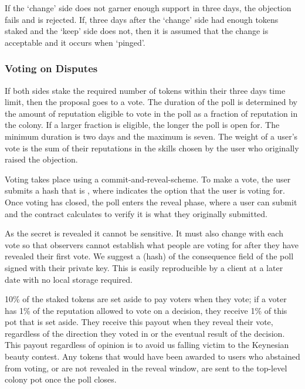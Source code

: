 If the `change' side does not garner enough support in three days, the objection fails and is rejected. If, three days after the `change' side had enough tokens staked and the `keep' side does not, then it is assumed that the change is acceptable and it occurs when `pinged'. 

\subsubsection{Voting on Disputes}
If both sides stake the required number of tokens within their three days time limit, then the proposal goes to a vote. The duration of the poll is determined by the amount of reputation eligible to vote in the poll as a fraction of reputation in the colony. If a larger fraction is eligible, the longer the poll is open for. The minimum duration is two days and the maximum is seven. The weight of a user's vote is the sum of their reputations in the skills chosen by the user who originally raised the objection.

Voting takes place using a commit-and-reveal-scheme. To make a vote, the user submits a hash that is , where  indicates the option that the user is voting for. Once voting has closed, the poll enters the reveal phase, where a user can submit  and the contract calculates  to verify it is what they originally submitted.

As the secret is revealed it cannot be sensitive. It must also change with each vote so that observers cannot establish what people are voting for after they have revealed their first vote. We suggest a (hash) of the consequence field of the poll signed with their private key. This is easily reproducible by a client at a later date with no local storage required.

10\% of the staked tokens are set aside to pay voters when they vote; if a voter has 1\% of the reputation allowed to vote on a decision, they receive 1\% of this pot that is set aside. They receive this payout when they reveal their vote, regardless of the direction they voted in or the eventual result of the decision. This payout regardless of opinion is to avoid us falling victim to the Keynesian beauty contest\cite{KeynesianBeauty}. Any tokens that would have been awarded to users who abstained from voting, or are not revealed in the reveal window, are sent to the top-level colony pot once the poll closes.


